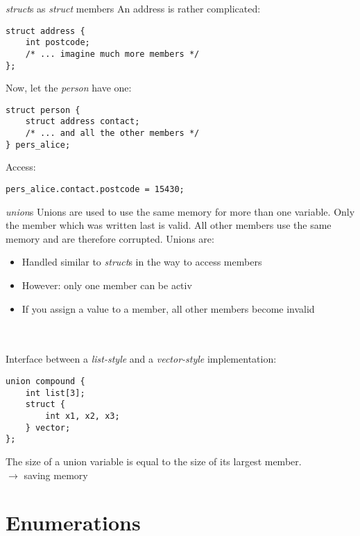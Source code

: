 
\begin{frame}[fragile]{\textit{struct}s as \textit{struct} members}
	An address is rather complicated:
	\begin{lstlisting}[numbers=none]
struct address {
	int postcode;
	/* ... imagine much more members */
};
\end{lstlisting}
	Now, let the \textit{person} have one:
	\begin{lstlisting}[numbers=none]
struct person {
	struct address contact;
	/* ... and all the other members */
} pers_alice;
\end{lstlisting}
	Access:
\begin{lstlisting}[numbers=none]
pers_alice.contact.postcode = 15430;
\end{lstlisting}
\end{frame}


\begin{frame}[fragile]{\textit{union}s}
Unions are used to use the same memory for more than one variable. Only the member which was written last is valid. All other members use the same memory and are therefore corrupted. Unions are:
	\begin{itemize}
		\item Handled similar to \textit{struct}s in the way to access members
		\item However: only one member can be activ
		\item If you assign a value to a member, all other members become invalid
	\end{itemize} \ \\ \ \\
	Interface between a \textit{list-style} and a \textit{vector-style} implementation:
	\begin{lstlisting}[numbers=none]
union compound {
	int list[3];
	struct {
		int x1, x2, x3;
	} vector;
};
\end{lstlisting}
	The size of a union variable is equal to the size of its largest member.\\
	$\rightarrow$ saving memory
\end{frame}

\section{Enumerations}

